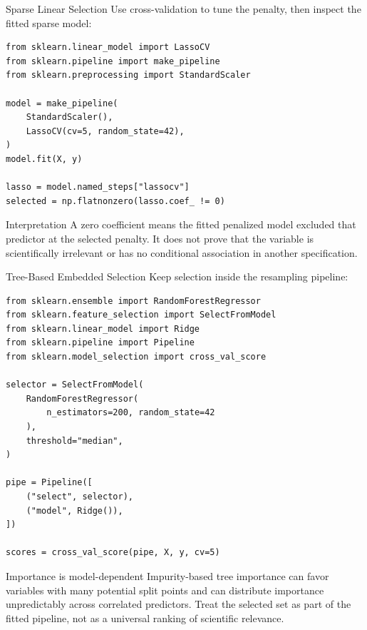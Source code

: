 \documentclass[aspectratio=169,11pt]{beamer}
\begin{document}
\begin{frame}[fragile]{Sparse Linear Selection}
Use cross-validation to tune the penalty, then inspect the fitted sparse model:

\begin{lstlisting}[style=code,basicstyle=\ttfamily\small]
from sklearn.linear_model import LassoCV
from sklearn.pipeline import make_pipeline
from sklearn.preprocessing import StandardScaler

model = make_pipeline(
    StandardScaler(),
    LassoCV(cv=5, random_state=42),
)
model.fit(X, y)

lasso = model.named_steps["lassocv"]
selected = np.flatnonzero(lasso.coef_ != 0)
\end{lstlisting}

\begin{block}{Interpretation}
A zero coefficient means the fitted penalized model excluded that predictor at the selected penalty. It does not prove that the variable is scientifically irrelevant or has no conditional association in another specification.
\end{block}
\end{frame}

\begin{frame}[fragile]{Tree-Based Embedded Selection}
Keep selection inside the resampling pipeline:

\begin{lstlisting}[style=code,basicstyle=\ttfamily\small]
from sklearn.ensemble import RandomForestRegressor
from sklearn.feature_selection import SelectFromModel
from sklearn.linear_model import Ridge
from sklearn.pipeline import Pipeline
from sklearn.model_selection import cross_val_score

selector = SelectFromModel(
    RandomForestRegressor(
        n_estimators=200, random_state=42
    ),
    threshold="median",
)

pipe = Pipeline([
    ("select", selector),
    ("model", Ridge()),
])

scores = cross_val_score(pipe, X, y, cv=5)
\end{lstlisting}

\begin{alertblock}{Importance is model-dependent}
Impurity-based tree importance can favor variables with many potential split points and can distribute importance unpredictably across correlated predictors. Treat the selected set as part of the fitted pipeline, not as a universal ranking of scientific relevance.
\end{alertblock}
\end{frame}
\end{document}
